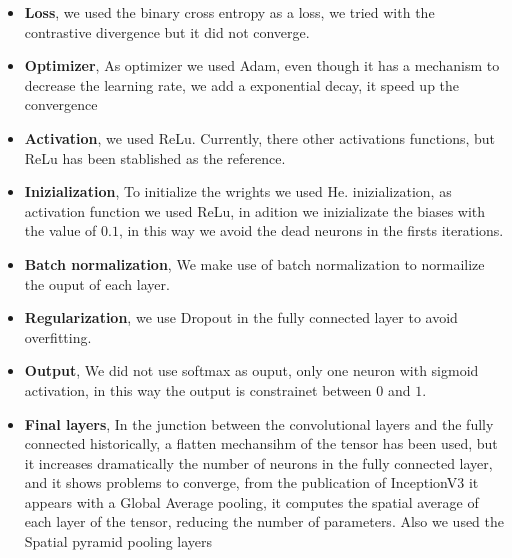 \documentclass[12pt, a4paper, titlepage,twoside,openright]{article}
\begin{document}
\begin{itemize}

\item \textbf{Loss}, we used the binary cross entropy as a loss, we tried with the contrastive divergence but it did not converge.

\item \textbf{Optimizer}, As optimizer we used Adam, even though it has a mechanism to decrease the learning rate, we add a exponential decay, it speed up the convergence

\item \textbf{Activation}, we used ReLu. Currently, there other activations functions, but ReLu has been stablished as the reference.

\item \textbf{Inizialization}, To initialize the wrights we used He. inizialization, as activation function we used ReLu, in adition we inizializate the biases with the value of $0.1$, in this way we avoid the dead neurons in the firsts iterations.

\item \textbf{Batch normalization}, We make use of batch normalization to normailize the ouput of each layer.

\item \textbf{Regularization}, we use Dropout in the fully connected layer to avoid overfitting.


\item \textbf{Output}, We did not use softmax as ouput, only one neuron with sigmoid activation, in this way the output is constrainet between $0$ and $1$.


\item \textbf{Final layers}, In the junction between the convolutional layers and the fully connected historically, a flatten mechansihm of the tensor has been used, but it increases dramatically the number of neurons in the fully connected layer, and it shows problems to converge, from the publication of InceptionV3 it appears with a Global Average pooling, it computes the spatial average of each layer of the tensor, reducing the number of parameters. Also we used the Spatial pyramid pooling layers

\begin{figure}[H]
		
\centering


\end{figure}
\end{itemize}
\end{document}
